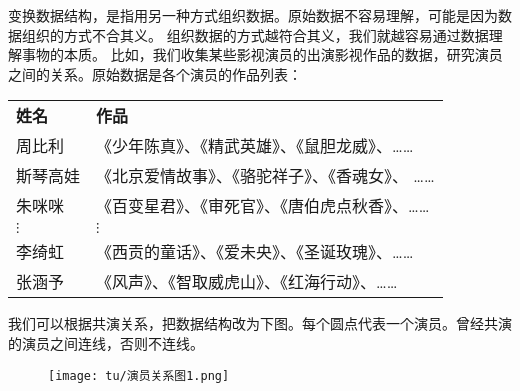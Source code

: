 \documentclass[12pt,UTF8]{ctexbook}
\theoremstyle{definition}
\theoremstyle{plain}
\begin{document}
变换数据结构，是指用另一种方式组织数据。原始数据不容易理解，可能是因为数据组织的方式不合其义。
组织数据的方式越符合其义，我们就越容易通过数据理解事物的本质。
比如，我们收集某些影视演员的出演影视作品的数据，研究演员之间的关系。原始数据是各个演员的作品列表：
\begin{center}
    \begin{tabular}{ p{4em}<{\centering} !{\color{white} \vrule width 2pt} p{22em}<{\centering} }
         \textbf{姓名} & \textbf{作品} \\ [0.5ex] 
         周比利 & 《少年陈真》、《精武英雄》、《鼠胆龙威》、…… \\  
         斯琴高娃 & 《北京爱情故事》、《骆驼祥子》、《香魂女》、 …… \\  
         朱咪咪 & 《百变星君》、《审死官》、《唐伯虎点秋香》、…… \\  
         $\vdots$ & $\vdots$ \\  
         李绮虹 & 《西贡的童话》、《爱未央》、《圣诞玫瑰》、…… \\  
         张涵予 & 《风声》、《智取威虎山》、《红海行动》、…… \\  
    \end{tabular}
\end{center}

我们可以根据共演关系，把数据结构改为下图。每个圆点代表一个演员。曾经共演的演员之间连线，否则不连线。
\begin{figure}[H] %
    \vspace{8pt}
    \centering
    \texttt{[image: tu/演员关系图1.png]}
\end{figure}
\end{document}
